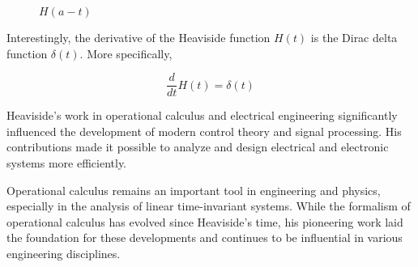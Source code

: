\documentclass{article}
\theoremstyle{definition}
\begin{document}
\begin{itemize}
\begin{itemize}
\bigskip
\begin{figure}[H]
  \centering                                                                            %
  \resizebox{0.60 \textwidth}{!} {                                                      %
  }																						%
  \caption{$H(a - t)$}
  \label{fig:H(a-t)}
\end{figure}
\end{itemize}

\bigskip
\noindent
Interestingly, the derivative of the Heaviside function $H(t)$ 
is the Dirac delta function $\delta(t)$. More specifically, 

\begin{equation*}
\dfrac{d}{dt} H(t) = \delta(t)
\end{equation*}

\bigskip
\noindent
Heaviside's work in operational calculus and electrical
engineering significantly influenced the development of modern
control theory and signal processing. His contributions made it
possible to analyze and design electrical and electronic systems
more efficiently.

\bigskip
\noindent
Operational calculus remains an important tool in engineering and
physics, especially in the analysis of linear time-invariant
systems. While the formalism of operational calculus has evolved
since Heaviside's time, his pioneering work laid the foundation
for these developments and continues to be influential in various
engineering disciplines.
\end{itemize}
\end{document}
